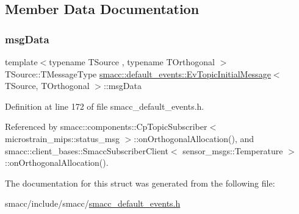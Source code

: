 \subsection{Member Data Documentation}
\mbox{\label{structsmacc_1_1default__events_1_1EvTopicInitialMessage_a0cc6d194c202e33c3fbc9bf0a3528256}} 
\subsubsection{\texorpdfstring{msg\+Data}{msgData}}
{\footnotesize\ttfamily template$<$typename T\+Source , typename T\+Orthogonal $>$ \\
T\+Source\+::\+T\+Message\+Type \hyperlink{structsmacc_1_1default__events_1_1EvTopicInitialMessage}{smacc\+::default\+\_\+events\+::\+Ev\+Topic\+Initial\+Message}$<$ T\+Source, T\+Orthogonal $>$\+::msg\+Data}



Definition at line 172 of file smacc\+\_\+default\+\_\+events.\+h.



Referenced by smacc\+::components\+::\+Cp\+Topic\+Subscriber$<$ microstrain\+\_\+mips\+::status\+\_\+msg $>$\+::on\+Orthogonal\+Allocation(), and smacc\+::client\+\_\+bases\+::\+Smacc\+Subscriber\+Client$<$ sensor\+\_\+msgs\+::\+Temperature $>$\+::on\+Orthogonal\+Allocation().



The documentation for this struct was generated from the following file\+:\begin{DoxyCompactItemize}
\item 
smacc/include/smacc/\hyperlink{smacc__default__events_8h}{smacc\+\_\+default\+\_\+events.\+h}\end{DoxyCompactItemize}
